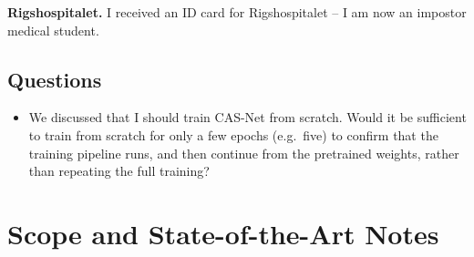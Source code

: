 \documentclass[11pt,a4paper]{article}
\begin{document}
\textbf{Rigshospitalet.} I received an ID card for Rigshospitalet -- I am now an impostor medical
student.

\subsection{Questions}

\begin{itemize}
  \item We discussed that I should train CAS-Net from scratch. Would it be sufficient to train from
    scratch for only a few epochs (e.g.\ five) to confirm that the training pipeline runs, and then
    continue from the pretrained weights, rather than repeating the full training?
\end{itemize}

\newpage


\section{Scope and State-of-the-Art Notes}


\label{sec:week2-major-vessel}



\newpage







\newpage
\printbibliography
\end{document}
